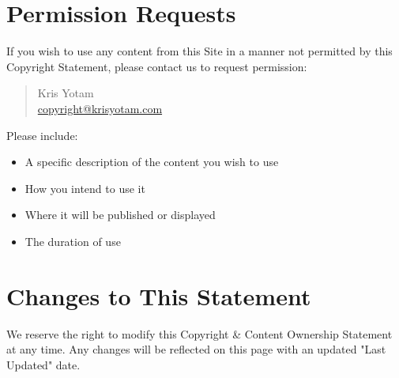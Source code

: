 \documentclass[11pt]{article}
\begin{document}
\section{Permission Requests}
If you wish to use any content from this Site in a manner not permitted by this Copyright Statement, please contact us to request permission:

\begin{quote}
  Kris Yotam\\
  \href{mailto:copyright@krisyotam.com}{copyright@krisyotam.com}
\end{quote}

Please include:
\begin{itemize}
  \item A specific description of the content you wish to use
  \item How you intend to use it
  \item Where it will be published or displayed
  \item The duration of use
\end{itemize}

\section{Changes to This Statement}
We reserve the right to modify this Copyright \& Content Ownership Statement at any time. Any changes will be reflected on this page with an updated "Last Updated" date.
\end{document}
